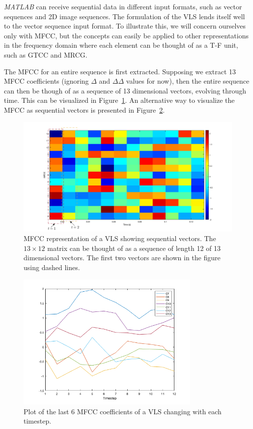 \textit{MATLAB} can receive sequential data in different input formats, such as
vector sequences and 2D image sequences. The formulation of the VLS lends itself
well to the vector sequence input format. To illustrate this, we will concern
ourselves only with MFCC, but the concepts can easily be applied to other
representations in the frequency domain where each element can be thought of as
a T-F unit, such as GTCC and MRCG\@.

The MFCC for an entire sequence is first extracted. Supposing we extract 13 MFCC
coefficients (ignoring $\Delta$ and $\Delta\Delta$ values for now), then the
entire sequence can then be though of as a sequence of 13 dimensional vectors,
evolving through time. This can be visualized in
Figure~\ref{fig:mfcc_vector_sequence}. An alternative way to visualize the MFCC
as sequential vectors is presented in Figure~\ref{fig:mfcc_vector_sequence_2}.

\begin{figure}[ht]
  \centering
  \includegraphics[width=\textwidth]{figures/mfcc_vector_sequence_labelled_2.png}
  \caption{MFCC representation of a VLS showing sequential vectors. The $13
  \times 12$ matrix can be thought of as a sequence of length 12 of 13
dimensional vectors. The first two vectors are shown in the figure using
dashed lines.}\label{fig:mfcc_vector_sequence}
\end{figure}

\begin{figure}[ht]
  \centering
  \includegraphics[width=0.8\textwidth]{figures/mfcc_vector_sequence_2.png}
  \caption{Plot of the last 6 MFCC coefficients of a VLS changing with each
  timestep.}\label{fig:mfcc_vector_sequence_2}
\end{figure}

